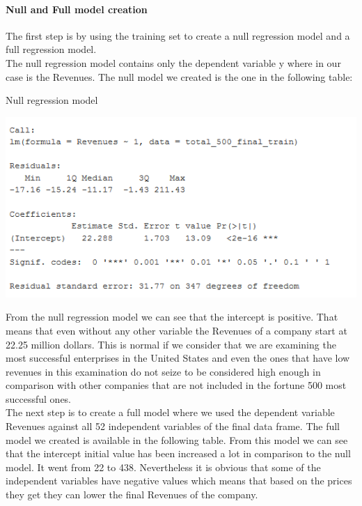 \documentclass{article}
\begin{document}
\paragraph{Null and Full model creation}
The first step is by using the training set to create a null regression model and a full regression model.\\
The null regression model contains only the dependent variable y where in our case is the Revenues. The null model we created is the one in the following table:
\begin{table}[H]
\centering
\caption{Null regression model}
\begin{center}
\includegraphics[scale=0.6]{../R/photos/65_null_model.PNG}   \\
\end{center}
\end{table}
From the null regression model we can see that the intercept is positive. That means that even without any other variable the Revenues of a company start at 22.25 million dollars. This is normal if we consider that we are examining the most successful enterprises in the United States and even the ones that have low revenues in this examination do not seize to be considered high enough in comparison with other companies that are not included in the fortune 500 most successful ones.\\
The next step is to create a full model where we used the dependent variable Revenues against all 52 independent variables of the final data frame. The full model we created is available in the following table. From this model we can see that the intercept initial value has been increased a lot in comparison to the null model. It went from 22 to 438. Nevertheless it is obvious that some of the independent variables have negative values which means that based on the prices they get they can lower the final Revenues of the company.\\
\end{document}
